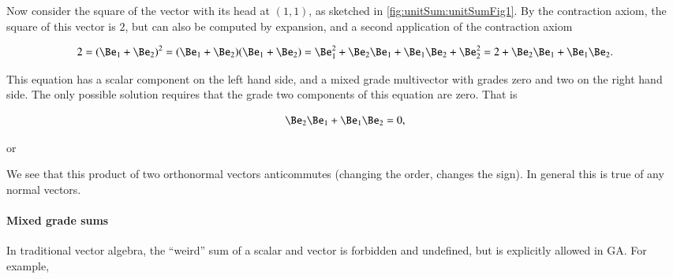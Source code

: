 
Now consider the square of the vector with its head at \( (1,1) \), as sketched in \cref{fig:unitSum:unitSumFig1}.  
By the contraction axiom, the square of this vector is \( 2\), but can also be computed by expansion, and a second application of the contraction axiom

\begin{dmath}\label{eqn:gaTutorial:80}
2
=
(\Be_1 + \Be_2)^2
= (\Be_1 + \Be_2)(\Be_1 + \Be_2)
= \Be_1^2 + \Be_2 \Be_1 + \Be_1 \Be_2 + \Be_2^2
= 2 + \Be_2 \Be_1 + \Be_1 \Be_2.
\end{dmath}

This equation has a scalar component on the left hand side, and a mixed grade multivector with grades zero and two on the right hand side.
The only possible solution requires that the grade two components of this equation are zero.  That is

\begin{dmath}\label{eqn:multivector:n}
\Be_2 \Be_1 + \Be_1 \Be_2 = 0,
\end{dmath}

or

We see that this product of two orthonormal vectors anticommutes (changing the order, changes the sign).  In general this is true of any normal vectors.


\paragraph{Mixed grade sums}
In traditional vector algebra, the 
``weird'' sum of a scalar and vector is forbidden and undefined, but is explicitly allowed in GA.  For example, 

